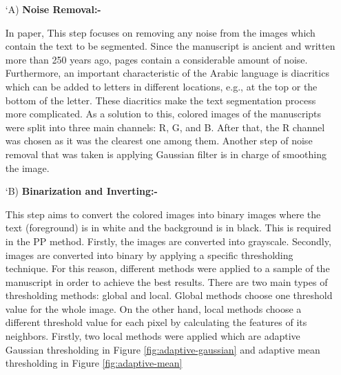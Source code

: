 \begin{itemize}[labelindent=1em,labelsep=0.25cm,leftmargin=*]
        \item[\char `A)] \textbf{Noise Removal:-}
       
        In paper, \cite{Shams2020} This step focuses on removing any noise from the images
        which contain the text to be segmented. 
        Since the manuscript is ancient and written more than 250
        years ago, pages contain a considerable amount of noise.
        Furthermore, an important characteristic of the Arabic language is
        diacritics which can be added to letters in different locations,
        e.g., at the top or the bottom of the letter. These diacritics make
        the text segmentation process more complicated. As a solution
        to this, colored images of the manuscripts were split into three
        main channels: R, G, and B. After that, the R channel was
        chosen as it was the clearest one among them.
        Another step of noise removal that was taken is applying
        Gaussian filter is in charge of smoothing the image.
        \item[\char `B)] \textbf{Binarization and Inverting:-}
        
        This step aims to convert the colored images into binary
        images where the text (foreground) is in white and the background is in black. This is required in the PP method.
        Firstly, the images are converted into grayscale. Secondly,
        images are converted into binary by applying a specific
        thresholding technique. For this reason, different methods were
        applied to a sample of the manuscript in order to achieve the
        best results. There are two main types of thresholding methods: global and local. Global methods choose one threshold value for the whole image. On the other hand, local methods choose
        a different threshold value for each pixel by calculating the
        features of its neighbors. Firstly, two local methods were
        applied which are adaptive Gaussian thresholding in 
        Figure \ref{fig:adaptive-gaussian} and adaptive mean thresholding in Figure \ref{fig:adaptive-mean} 
        

\end{itemize}
